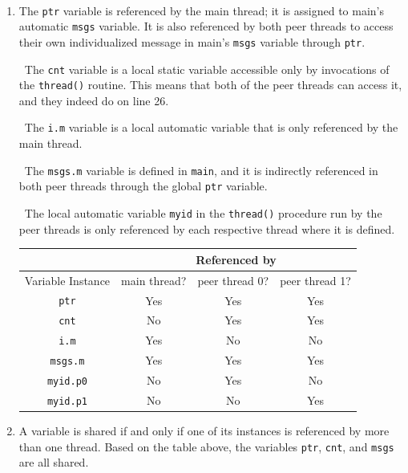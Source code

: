 \documentclass[12pt]{article}
\newenvironment{sol}[1][Solution]{\begin{trivlist}
		\item[\hskip \labelsep {\bfseries #1:}]}{\end{trivlist}}
\begin{document}
\begin{sol}
	\
	\begin{enumerate}[label=(\alph*)]
		\item The \texttt{ptr} variable is referenced by the main thread; it is assigned
		to main's automatic \texttt{msgs} variable. It is also referenced by both peer threads
		to access their own individualized message in main's \texttt{msgs} variable through
		\texttt{ptr}.
		
		\
		The \texttt{cnt} variable is a local static variable accessible only by invocations
		of the \texttt{thread()} routine. This means that both of the peer threads can access
		it, and they indeed do on line 26.
		
		\
		The \texttt{i.m} variable is a local automatic variable that is only referenced by
		the main thread.
		
		\
		The \texttt{msgs.m} variable is defined in \texttt{main}, and it is indirectly
		referenced in both peer threads through the global \texttt{ptr} variable.
		
		\
		The local automatic variable \texttt{myid} in the \texttt{thread()} procedure run
		by the peer threads is only referenced by each respective thread where it is defined.
		\begin{center}
			\begin{tabular}{cccc}
				{} & \multicolumn{3}{c}{Referenced by}\\
				\hline
				Variable Instance & main thread? & peer thread 0? & peer thread 1?\\
				\hline
				\texttt{ptr} & Yes & Yes & Yes \\
				\texttt{cnt} & No & Yes & Yes \\
				\texttt{i.m} & Yes & No & No \\
				\texttt{msgs.m} & Yes & Yes & Yes \\
				\texttt{myid.p0} & No & Yes & No \\
				\texttt{myid.p1} & No & No & Yes \\
			\end{tabular}
		\end{center}
		\item A variable is shared if and only if one of its instances is referenced by more than
		one thread. Based on the table above, the variables \texttt{ptr}, \texttt{cnt}, and
		\texttt{msgs} are all shared.
	\end{enumerate}
\end{sol}
\end{document}
